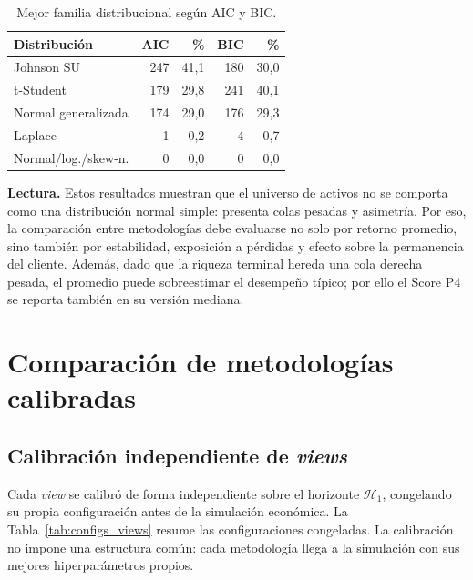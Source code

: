 \begin{table}[h]
\centering
\caption{Mejor familia distribucional seg\'un AIC y BIC.}
\label{tab:best_dist}
\scriptsize
\begin{tabular}{@{}lrrrr@{}}
\toprule
Distribuci\'on & AIC & \% & BIC & \% \\
\midrule
Johnson SU & 247 & 41,1 & 180 & 30,0 \\
t-Student & 179 & 29,8 & 241 & 40,1 \\
Normal generalizada & 174 & 29,0 & 176 & 29,3 \\
Laplace & 1 & 0,2 & 4 & 0,7 \\
Normal/log./skew-n. & 0 & 0,0 & 0 & 0,0 \\
\bottomrule
\end{tabular}
\end{table}

\medskip
\noindent\textbf{Lectura.} Estos resultados muestran que el universo de activos
no se comporta como una distribuci\'on normal simple: presenta colas pesadas y
asimetr\'ia. Por eso, la comparaci\'on entre metodolog\'ias debe evaluarse no
solo por retorno promedio, sino tambi\'en por estabilidad, exposici\'on a
p\'erdidas y efecto sobre la permanencia del cliente. Adem\'as, dado que la
riqueza terminal hereda una cola derecha pesada, el promedio puede sobreestimar
el desempe\~no t\'ipico; por ello el Score P4 se reporta tambi\'en en su
versi\'on mediana.

\section{Comparaci\'on de metodolog\'ias calibradas}

\subsection{Calibraci\'on independiente de \textit{views}}

Cada \textit{view} se calibr\'o de forma independiente sobre el horizonte
$\mathcal{H}_1$, congelando su propia configuraci\'on antes de la simulaci\'on
econ\'omica. La Tabla~\ref{tab:configs_views} resume las configuraciones
congeladas. La calibraci\'on no impone una estructura com\'un: cada metodolog\'ia
llega a la simulaci\'on con sus mejores hiperpar\'ametros propios.

